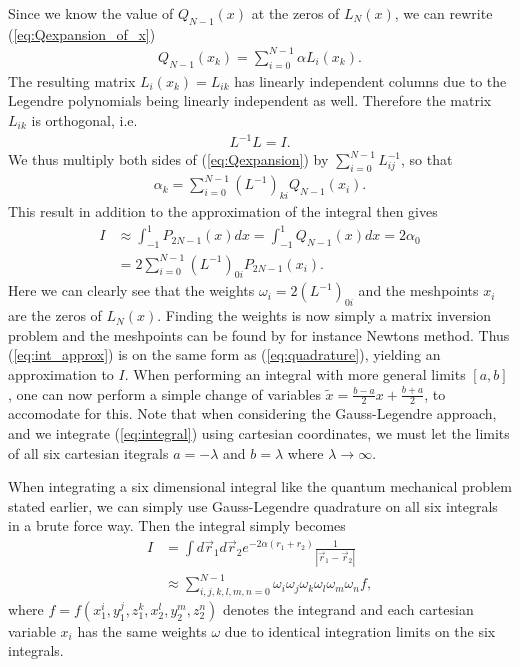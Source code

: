 \documentclass[10pt, twocolumn]{aastex62}
\begin{document}
Since we know the value of $Q_{N-1}(x)$ at the zeros of $L_N(x)$, we can rewrite
(\ref{eq:Qexpansion_of_x})
\begin{align}
	Q_{N-1} (x_k)= \sum^{N-1}_{i=0} \alpha L_i(x_k).
	\label{eq:Qexpansion}
\end{align}
The resulting matrix $L_i(x_k) = L_{ik}$ has linearly independent columns due to
the Legendre polynomials being linearly independent as well. Therefore the
matrix $L_{ik}$ is orthogonal, i.e.
\begin{align}
	L^{-1}L = I.
\end{align}
We thus multiply both sides of (\ref{eq:Qexpansion}) by
$\sum^{N-1}_{i=0}L^{-1}_{ij}$, so that 
\begin{align}
	\alpha_k = \sum_{i=0}^{N-1} (L^{-1})_{ki}Q_{N-1}(x_i).
\end{align}
This result in addition to the approximation of the integral then gives
\begin{align}
	I &\approx \int^1_{-1} P_{2N-1}(x)dx = \int^1_{-1} Q_{N-1}(x)dx = 2\alpha_0 \\
	&= 2 \sum^{N-1}_{i=0} (L^{-1})_{0i}P_{2N-1}(x_i).
	\label{eq:int_approx}
\end{align}
Here we can clearly see that the weights $\omega_i = 2(L^{-1})_{0i}$ and the
meshpoints $x_i$ are the zeros of $L_N(x)$. Finding the weights is now simply a
matrix inversion problem and the meshpoints can be found by for instance Newtons
method. Thus (\ref{eq:int_approx}) is on the same form as (\ref{eq:quadrature}),
yielding an approximation to $I$. When performing an integral with more general
limits $[a,b]$, one can now perform a simple change of variables $\tilde{x} =
\frac{b - a}{2}x + \frac{b + a}{2}$, to accomodate for this. Note that when
considering the Gauss-Legendre approach, and we integrate (\ref{eq:integral})
using cartesian coordinates, we must let the limits of all six cartesian
itegrals $a = -\lambda$ and $b = \lambda$ where $\lambda\to\infty$.

When integrating a six dimensional integral like the quantum mechanical problem
stated earlier, we can simply use Gauss-Legendre quadrature on all six integrals
in a brute force way. Then the integral simply becomes 
\begin{align}
	I &= \int d\vec{r}_1d\vec{r}_2 e^{-2\alpha(r_1 + r_2)}\frac{1}{|\vec{r}_1 - \vec{r}_2|} \\
	&\approx \sum_{i, j, k, l, m, n = 0}^{N-1} \omega_i \omega_j \omega_k \omega_l \omega_m \omega_n f,
\end{align} 
where $f = f(x_1^i, y_1^j, z_1^k, x_2^l, y_2^m, z_2^n)$ denotes the integrand
and each cartesian variable $x_i$ has the same weights $\omega$ due to identical
integration limits on the six integrals. 
\end{document}
